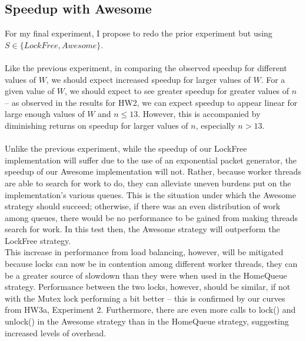 \documentclass[]{article}
\begin{document}
\subsection{Speedup with Awesome}
For my final experiment, I propose to redo the prior experiment but using $S \in \{LockFree, Awesome\}$.
\\\\
Like the previous experiment, in comparing the observed speedup for different values of $W$, we should expect increased speedup for larger values of $W$. For a given value of $W$, we should expect to see greater speedup for greater values of $n$ -- as observed in the results for HW2, we can expect speedup to appear linear for large enough values of $W$ and $n \leq 13$. However, this is accompanied by diminishing returns on speedup for larger values of $n$, especially $n > 13$.
\\\\
Unlike the previous experiment, while the speedup of our LockFree implementation will suffer due to the use of an exponential packet generator, the speedup of our Awesome implementation  will not. Rather, because worker threads are able to search for work to do, they can alleviate uneven burdens put on the implementation's various queues. This is the situation under which the Awesome strategy should succeed; otherwise, if there was an even distribution of work among queues, there would be no performance to be gained from making threads search for work. In this test then, the Awesome strategy will outperform the LockFree strategy.
\\
This increase in performance from load balancing, however, will be mitigated because locks can now be in contention among different worker threads, they can be a greater source of slowdown than they were when used in the HomeQueue strategy. Performance between the two locks, however, should be similar, if not with the Mutex lock performing a bit better -- this is confirmed by our curves from HW3a, Experiment 2. Furthermore, there are even more calls to lock() and unlock() in the Awesome strategy than in the HomeQueue strategy, suggesting increased levels of overhead. 
\end{document}
